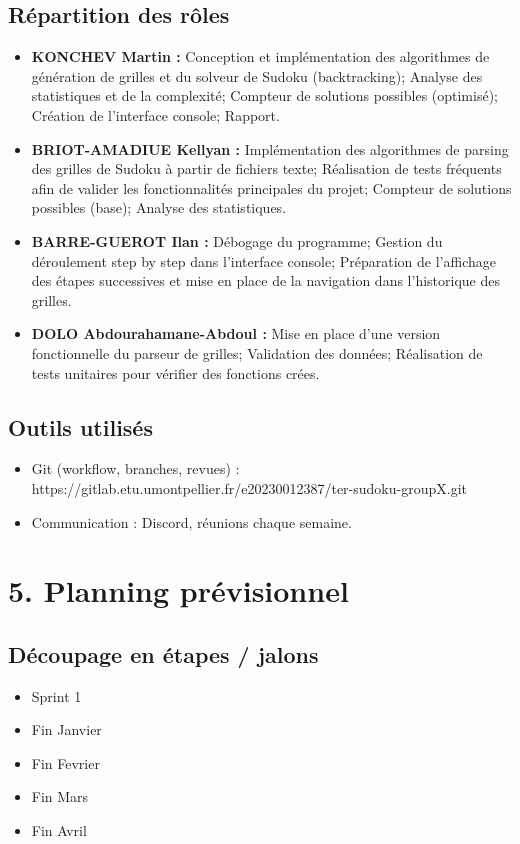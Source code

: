 \documentclass[a4paper]{article}
\begin{document}
\subsection*{Répartition des rôles}
\begin{itemize}
  \item \textbf{KONCHEV Martin :} Conception et implémentation des algorithmes de génération de grilles et du solveur de Sudoku (backtracking); Analyse des statistiques et de la complexité; Compteur de solutions possibles (optimisé); Création de l’interface console; Rapport.
  \item \textbf{BRIOT-AMADIUE Kellyan :} Implémentation des algorithmes de parsing des grilles de Sudoku à partir de fichiers texte; Réalisation de tests fréquents afin de valider les fonctionnalités principales du projet; Compteur de solutions possibles (base); Analyse des statistiques.
  \item \textbf{BARRE-GUEROT Ilan :} Débogage du programme; Gestion du déroulement step by step dans l’interface console; Préparation de l’affichage des étapes successives et mise en place de la navigation dans l’historique des grilles.
  \item \textbf{DOLO Abdourahamane-Abdoul :} Mise en place d’une version fonctionnelle du parseur de grilles; Validation des données; Réalisation de tests unitaires pour vérifier des fonctions crées.
\end{itemize}

\subsection*{Outils utilisés}
\begin{itemize}
  \item Git (workflow, branches, revues) : https://gitlab.etu.umontpellier.fr/e20230012387/ter-sudoku-groupX.git
  \item Communication : Discord, réunions chaque semaine.
\end{itemize}

\section*{5. Planning prévisionnel}
\subsection*{Découpage en étapes / jalons}
\begin{itemize}
\item Sprint 1
\item Fin Janvier
\item Fin Fevrier
\item Fin Mars
\item Fin Avril
\end{itemize}
\end{document}
